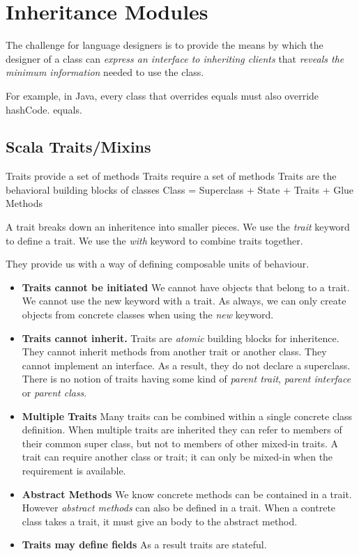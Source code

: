 
\chapter{Inheritance Modules}

The challenge for language designers is to provide the means by which the designer 
of a class can  \textit{express an interface to inheriting clients} 
that \textit{reveals the minimum information} needed to use the class.



For example, in Java, every class that overrides equals must also override hashCode.
equals.



\section{Scala Traits/Mixins}
Traits provide a set of methods 
Traits require a set of methods
Traits are the behavioral building blocks of classes
Class = Superclass + State + Traits + Glue Methods

A trait breaks down an inheritence into smaller pieces.
We use the \textit{trait} keyword to define a trait.
We use the \textit{with} keyword to combine traits together. 

They provide us with a way of defining composable units of behaviour.

\begin{itemize}   
\renewcommand{\labelitemi}{$\Box$}
\item \textbf{Traits cannot be initiated}
We cannot have objects that belong to a trait. 
We cannot use the new keyword with a trait. 
As always, we can only create objects from concrete classes when using the \textit{new} keyword.
\item \textbf{Traits cannot inherit.}
Traits are \textit{atomic} building blocks for inheritence.
They cannot inherit methods from another trait or another class. 
They cannot implement an interface. As a result, they do not declare a superclass. 
There is no notion of traits having some kind of
\textit{parent trait}, \textit{parent interface} or \textit{parent class}. 
\item \textbf{Multiple Traits}
Many traits can be combined within a single concrete class definition.
When multiple traits are inherited they can refer to members of their common super class,
but not to members of other mixed-in traits.
A trait can require another class or trait;
it can only be mixed-in when the requirement is available.
\item \textbf{Abstract Methods} 
We know concrete methods can be contained in a trait.
However \textit{abstract methods} can also be defined in a trait.
When a contrete class takes a trait, it must give an body to the abstract method.
\item \textbf{Traits may define fields}
As a result traits are stateful. 
\end{itemize}

